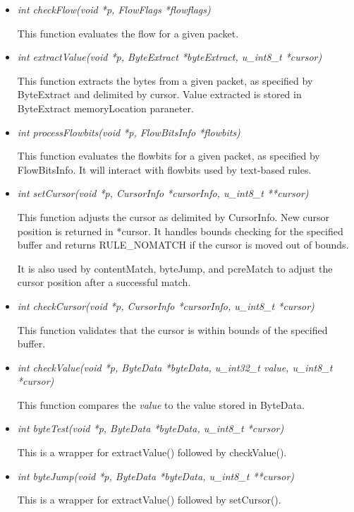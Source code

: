 \documentclass[english]{report}
\begin{document}
\begin{itemize}
\begin{itemize}
\item {\em int checkFlow(void *p, FlowFlags *flowflags)}

This function evaluates the flow for a given packet.

\item {\em int extractValue(void *p, ByteExtract *byteExtract, u\_int8\_t *cursor)}

This function extracts the bytes from a given packet, as specified
by ByteExtract and delimited by cursor.  Value extracted is stored
in ByteExtract memoryLocation paraneter.

\item {\em int processFlowbits(void *p, FlowBitsInfo *flowbits)}

This function evaluates the flowbits for a given packet, as specified
by FlowBitsInfo.  It will interact with flowbits used by text-based
rules.

\item {\em int setCursor(void *p, CursorInfo *cursorInfo, u\_int8\_t **cursor)}

This function adjusts the cursor as delimited by CursorInfo.
New cursor position is returned in *cursor.  It handles bounds
checking for the specified buffer and returns RULE\_NOMATCH if
the cursor is moved out of bounds.  

It is also used by contentMatch, byteJump, and pcreMatch to adjust
the cursor position after a successful match.

\item {\em int checkCursor(void *p, CursorInfo *cursorInfo, u\_int8\_t *cursor)}

This function validates that the cursor is within bounds of the
specified buffer.

\item {\em int checkValue(void *p, ByteData *byteData, u\_int32\_t value, u\_int8\_t *cursor)}

This function compares the {\em value} to the value stored in ByteData.

\item {\em int byteTest(void *p, ByteData *byteData, u\_int8\_t *cursor)}

This is a wrapper for extractValue() followed by checkValue().

\item {\em int byteJump(void *p, ByteData *byteData, u\_int8\_t **cursor)}

This is a wrapper for extractValue() followed by setCursor().


\end{itemize}
\end{itemize}
\end{document}
